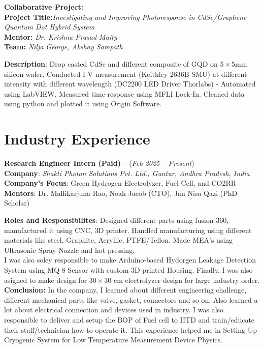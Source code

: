 \documentclass[a4paper,10pt]{article}
\begin{document}
\vspace{0.5em}

\textbf{Collaborative Project:} \\
\textbf{Project Title:}\textit{Investigating and Improving Photoresponse in CdSe/Graphene Quantum Dot Hybrid System}\\
\textbf{Mentor:}\textit{ Dr. Krishna Prasad Maity} \\
\textbf{Team:}\textit{ Nilja George, Akshay Sampath}

\textbf{Description}: Drop casted CdSe and different composite of GQD on $5 \times 5$mm silicon wafer. Conducted I-V measurement (Keithley 2636B SMU) at different intensity with different wavelength (DC2200 LED Driver Thorlabs) - Automated using LabVIEW. Measured time-response using MFLI Lock-In. Cleaned data using python and plotted it using Origin Software.


\section*{Industry Experience}

\textbf{Research Engineer Intern (Paid)} – (\textit{Feb 2025 – Present}) \\
\textbf{Company}: \textit{Shakti Photon Solutions Pvt. Ltd., Guntur, Andhra Pradesh, India} \\
\textbf{Company's Focus}: Green Hydrogen Electrolyzer, Fuel Cell, and CO2RR\\
\textbf{Mentors}: Dr. Mallikarjuna Rao, Noah Jacob (CTO), Jan Nisa Qazi (PhD Scholar)

\textbf{Roles and Responsibilites}: Designed different parts using fusion 360, manufactured it using CNC, 3D printer. Handled manufacturing using different materials like steel, Graphite, Acryllic, PTFE/Teflon. Made MEA's using Ultrasonic Spray Nozzle and hot pressing.\\ I was also soley responsible to make Arduino-based Hydorgen Leakage Detection System using MQ-8 Sensor with custom 3D printed Housing. Finally, I was also asigned to make design for $30 \times 30$ cm electrolyzer design for large industry order.\\
\textbf{Conclusion:} In the company, I learned about different engineering challenge, different mechanical parts like valve, gasket, connectors and so on. Also learned a lot about electrical connection and devices used in industry. I was also responsible to deliver and setup the BOP of Fuel cell to IITD and train/educate their staff/technician how to operate it. This experience helped me in Setting Up Cryogenic System for Low Temperature Measurement Device Physics.
\end{document}
